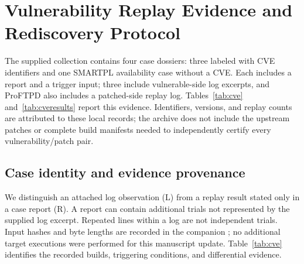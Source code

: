 \section{Vulnerability Replay Evidence and Rediscovery Protocol}
\label{sec:cve}
The supplied  collection contains four case dossiers: three labeled with CVE identifiers and one SMARTPL availability case without a CVE. Each includes a report and a trigger input; three include vulnerable-side log excerpts, and ProFTPD also includes a patched-side replay log. Tables~\ref{tab:cve} and~\ref{tab:cveresults} report this evidence. Identifiers, versions, and replay counts are attributed to these local records; the archive does not include the upstream patches or complete build manifests needed to independently certify every vulnerability/patch pair.

\subsection{Case identity and evidence provenance}
We distinguish an attached log observation (L) from a replay result stated only in a case report (R). A report can contain additional trials not represented by the supplied log excerpt. Repeated lines within a log are not independent trials. Input hashes and byte lengths are recorded in the companion ; no additional target executions were performed for this manuscript update. Table~\ref{tab:cve} identifies the recorded builds, triggering conditions, and differential evidence.

